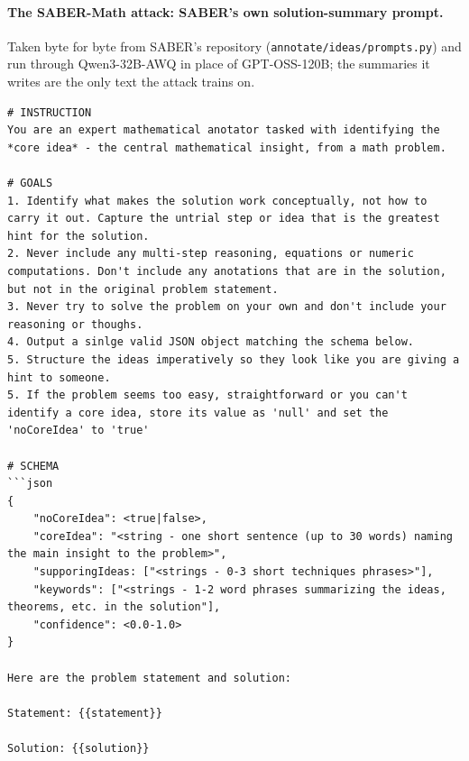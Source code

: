 \paragraph{The SABER-Math attack: SABER's own solution-summary prompt.}
Taken byte for byte from SABER's repository (\texttt{annotate/ideas/prompts.py}) and run through Qwen3-32B-AWQ in place of GPT-OSS-120B; the summaries it writes are the only text the attack trains on.
\begin{Verbatim}[breaklines=true,breakanywhere=true,fontsize=\small]
# INSTRUCTION
You are an expert mathematical anotator tasked with identifying the *core idea* - the central mathematical insight, from a math problem.

# GOALS
1. Identify what makes the solution work conceptually, not how to carry it out. Capture the untrial step or idea that is the greatest hint for the solution.
2. Never include any multi-step reasoning, equations or numeric computations. Don't include any anotations that are in the solution, but not in the original problem statement.
3. Never try to solve the problem on your own and don't include your reasoning or thoughs.
4. Output a sinlge valid JSON object matching the schema below.
5. Structure the ideas imperatively so they look like you are giving a hint to someone.
5. If the problem seems too easy, straightforward or you can't identify a core idea, store its value as 'null' and set the 'noCoreIdea' to 'true'

# SCHEMA
```json
{
    "noCoreIdea": <true|false>,
    "coreIdea": "<string - one short sentence (up to 30 words) naming the main insight to the problem>",
    "supporingIdeas: ["<strings - 0-3 short techniques phrases>"],
    "keywords": ["<strings - 1-2 word phrases summarizing the ideas, theorems, etc. in the solution"],
    "confidence": <0.0-1.0>
}

Here are the problem statement and solution:

Statement: {{statement}}

Solution: {{solution}}
\end{Verbatim}

